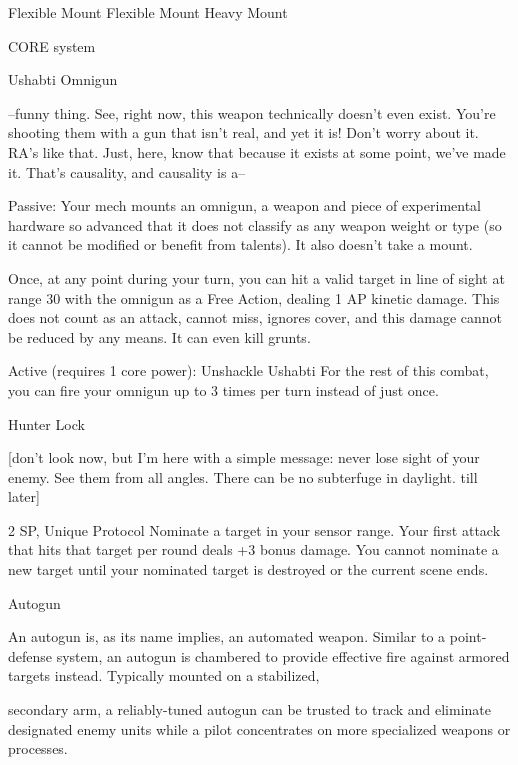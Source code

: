   Flexible Mount                      Flexible Mount                          Heavy Mount

                                                   CORE system

                                                 Ushabti Omnigun

   --funny thing. See, right now, this weapon technically doesn’t even exist. You’re shooting them with a
  gun that isn’t real, and yet it is! Don’t worry about it.  RA’s like that. Just, here, know that because it
  exists at some point, we’ve made it. That’s causality, and causality is a--

  Passive: Your mech mounts an omnigun, a weapon and piece of experimental hardware so advanced
  that it does not classify as any weapon weight or type (so it cannot be modified or benefit from talents).
  It also doesn’t take a mount.

  Once, at any point during your turn, you can hit a valid target in line of sight at range 30 with the
  omnigun as a Free Action, dealing 1 AP kinetic damage. This does not count as an attack, cannot miss,
  ignores cover, and this damage cannot be reduced by any means. It can even kill grunts.

  Active (requires 1 core power): Unshackle Ushabti
  For the rest of this combat, you can fire your omnigun up to 3 times per turn instead of just once.

Hunter Lock

[don’t look now, but I’m here with a simple message: never lose sight of your enemy. See them from all
angles. There can be no subterfuge in daylight. till later]


2 SP, Unique
Protocol
Nominate a target in your sensor range. Your first attack that hits that target per round deals +3
bonus damage. You cannot nominate a new target until your nominated target is destroyed or
the current scene ends.





Autogun

An autogun is, as its name implies, an automated weapon. Similar to a point-defense system, an autogun is
chambered to provide effective fire against armored targets instead. Typically mounted on a stabilized,

secondary arm, a reliably-tuned autogun can be trusted to track and eliminate designated enemy units
while a pilot concentrates on more specialized weapons or processes.

